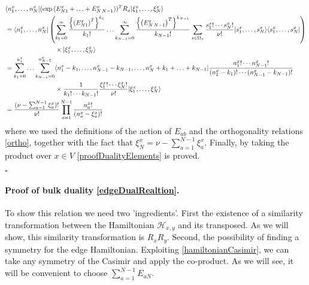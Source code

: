 \documentclass[10pt]{article}
\numberwithin{equation}{section}
\numberwithin{equation}{subsection}
\begin{document}
\begin{align}
&\langle n_{1}^{x},\ldots,n_{N}^{x}|(\exp{(E_{N1}^{x}+\ldots+E_{N\,N-1}^{x})})^{T}R_{x}|\xi_{1}^{x},\ldots,\xi_{N}^{x}\rangle\nonumber\\&= \langle  n_{1}^{x},\ldots,n_{N}^{x}|\left(\sum_{k_{1}=0}^{\infty}\frac{\left\{\left(E_{N1}^{x}\right)^{T}\right\}^{k_{1}}}{k_{1}!}\ldots\sum_{k_{N-1}=0}^{\infty}\frac{\left\{\left(E_{N\,N-1}^{x}\right)^{T}\right\}^{k_{N-1}}}{k_{N-1}!}\sum_{s\in\Omega_{x}}\frac{s_{1}^{x}!\cdots s_{N}^{x}!}{\nu!}|s_{1}^{x},\ldots,s_{N}^{x}\rangle\langle s_{1}^{x},\ldots,s_{N}^{x}|\right)\nonumber
\\&
\hspace{2.cm}\qquad\times |\xi_{1}^{x},\ldots,\xi_{N}^{x}\rangle\nonumber
\\&=
\sum_{k_{1}=0}^{n_{1}^{x}}\ldots\sum_{k_{N-1}=0}^{n_{N-1}^{x}}\langle n_{1}^{x}-k_{1},\ldots,n_{N-1}^{x}-k_{N-1},\ldots,n_{N}^{x}+k_{1}+\ldots+k_{N-1}|\frac{n_{1}^{x}!\cdots n_{N-1}^{x}!}{(n_{1}^{x}-k_{1})!\cdots(n_{N-1}^{x}-k_{N-1})!}\nonumber
\\& 
\hspace{2.cm}\qquad\times \frac{1}{k_{1}!\cdots k_{N-1}!}\frac{\xi_{1}^{x}!\cdots \xi_{N}^{x}!}{\nu!}|\xi_{1}^{x},\ldots,\xi_{N}^{x}\rangle\nonumber
\\&=
\frac{(\nu-\sum_{a=1}^{N-1}\xi_{a}^{x})!}{\nu!}\prod_{a=1}^{N-1}\frac{n_{a}^{x}!}{(n_{a}^{x}-\xi_{a}^{x})!}
\end{align}
where we used the definitions of the action of $E_{ab}$  and the orthogonality relations \eqref{ortho}, together with the fact that $\xi_{N}^{x}=\nu-\sum_{a=1}^{N-1}\xi_{a}^{x}$. 
Finally, by taking the product over $x\in V$ \eqref{proofDualityElements} is proved.
\begin{flushright}
    $\square$
\end{flushright}


\paragraph{Proof of bulk duality \eqref{edgeDualRealtion}.}To show this relation we need two 'ingredients'. First the existence of a similarity transformation between the Hamiltonian $\mathcal{H}_{x,y}$  and its transposed. As we will show, this similarity transformation is $R_{x}R_{y}$.  Second, the possibility of finding a symmetry for the edge Hamiltonian. Exploiting \eqref{hamiltonianCasimir}, we can take any symmetry of the Casimir and apply the co-product. As we will see, it will be convenient to choose $\sum_{a=1}^{N-1}E_{aN}$. 
\end{document}

